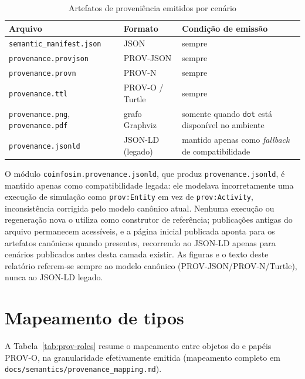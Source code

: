 \begin{table}[H]
  \centering
  \small
  \caption{Artefatos de proveniência emitidos por cenário}
  \label{tab:prov-artifacts}
  \begin{tabularx}{\textwidth}{>{\raggedright\arraybackslash}p{4.3cm}>{\raggedright\arraybackslash}p{2.6cm}X}
    \toprule
    Arquivo & Formato & Condição de emissão \\
    \midrule
    \texttt{semantic\_\allowbreak manifest.json} & JSON & sempre \\
    \texttt{provenance.provjson} & PROV-JSON & sempre \\
    \texttt{provenance.provn} & PROV-N & sempre \\
    \texttt{provenance.ttl} & PROV-O / Turtle & sempre \\
    \texttt{provenance.png}, \texttt{provenance.pdf} & grafo Graphviz & somente quando \texttt{dot} está disponível no ambiente \\
    \texttt{provenance.jsonld} & JSON-LD (legado) & mantido apenas como \emph{fallback} de compatibilidade \\
    \bottomrule
  \end{tabularx}
\end{table}

O módulo \texttt{coinfosim.provenance.jsonld}, que produz \texttt{provenance.jsonld}, é mantido apenas como compatibilidade legada: ele modelava incorretamente uma execução de simulação como \texttt{prov:Entity} em vez de \texttt{prov:Activity}, inconsistência corrigida pelo modelo canônico atual. Nenhuma execução ou regeneração nova o utiliza como construtor de referência; publicações antigas do arquivo permanecem acessíveis, e a página inicial publicada aponta para os artefatos canônicos quando presentes, recorrendo ao JSON-LD apenas para cenários publicados antes desta camada existir. As figuras e o texto deste relatório referem-se sempre ao modelo canônico (PROV-JSON/PROV-N/Turtle), nunca ao JSON-LD legado.

\section{Mapeamento de tipos}

\begin{sloppypar}
A Tabela~\ref{tab:prov-roles} resume o mapeamento entre objetos do \CoInfoSim{} e papéis PROV-O, na granularidade efetivamente emitida (mapeamento completo em \texttt{docs/semantics/provenance\_mapping.md}).
\end{sloppypar}

